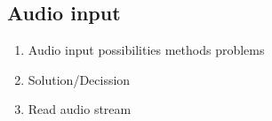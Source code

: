 \subsection{Audio input}

\begin{enumerate}
  \item Audio input possibilities
  \subitem methods
  \subitem problems
  \item Solution/Decission
  \item Read audio stream
\end{enumerate}